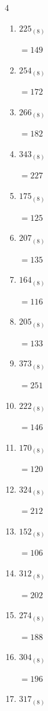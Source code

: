 \begin{multicols}{4}
\begin{enumerate}
  \item $225_{(8)}$

        $=149$

  \item $254_{(8)}$

        $=172$

  \item $266_{(8)}$

        $=182$

  \item $343_{(8)}$

        $=227$

  \item $175_{(8)}$

        $=125$

\columnbreak %

  \item $207_{(8)}$

        $=135$

  \item $164_{(8)}$

        $=116$

  \item $205_{(8)}$

        $=133$

  \item $373_{(8)}$

        $=251$

  \item $222_{(8)}$

        $=146$

  \item $170_{(8)}$

        $=120$

  \item $324_{(8)}$

        $=212$

  \item $152_{(8)}$

        $=106$

  \item $312_{(8)}$

        $=202$

  \item $274_{(8)}$

        $=188$

  \item $304_{(8)}$

        $=196$

  \item $317_{(8)}$


\end{enumerate}
\end{multicols}
